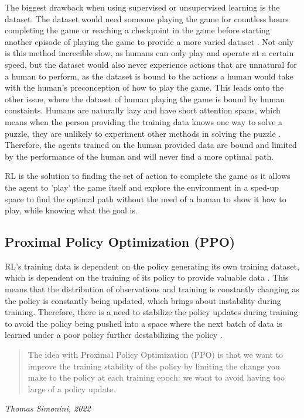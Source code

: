 The biggest drawback when using supervised or unsupervised learning is the dataset. The dataset would need someone playing the game for countless hours completing the game or reaching a checkpoint in the game before starting another episode of playing the game to provide a more varied dataset \cite{XanderSteenbrugge2019intro}. Not only is this method increcible slow, as humans can only play and operate at a certain speed, but the dataset would also never experience actions that are unnatural for a human to perform, as the dataset is bound to the actions a human would take with the human's preconception of how to play the game. This leads onto the other issue, where the dataset of human playing the game is bound by human constaints. Humans are naturally lazy and have short attention spans, which means when the person providing the training data knows one way to solve a puzzle, they are unlikely to experiment other methods in solving the puzzle \cite{XanderSteenbrugge2019intro}. Therefore, the agents trained on the human provided data are bound and limited by the performance of the human and will never find a more optimal path. 

RL is the solution to finding the set of action to complete the game as it allows the agent to 'play' the game itself and explore the environment in a sped-up space to find the optimal path without the need of a human to show it how to play, while knowing what the goal is. 

\subsection{Proximal Policy Optimization (PPO)}

RL's training data is dependent on the policy generating its own training dataset, which is dependent on the training of its policy to provide valuable data \cite{XanderSteenbrugge2019ppo}. This means that the distribution of observations and training is constantly changing as the policy is constantly being updated, which brings about instability during training. Therefore, there is a need to stabilize the policy updates during training to avoid the policy being pushed into a space where the next batch of data is learned under a poor policy further destabilizing the policy \cite{XanderSteenbrugge2019ppo}.

\begin{quote}
    The idea with Proximal Policy Optimization (PPO) is that we want to improve the training stability of the policy by limiting the change you make to the policy at each training epoch: we want to avoid having too large of a policy update.
    \end{quote}
    \hspace*{\fill} \textit{Thomas Simonini, 2022}

